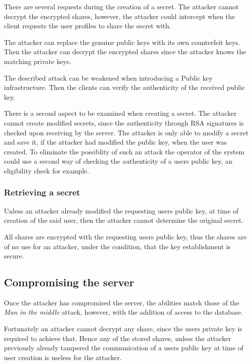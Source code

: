 There are several requests during the creation of a secret. The attacker cannot
decrypt the encrypted shares, however, the attacker could intercept when the
client requests the user profiles to share the secret with.

The attacker can replace the genuine public keys with its own counterfeit keys.
Then the attacker can decrypt the encrypted shares since the attacker knows the
matching private keys.

The described attack can be weakened when introducing a Public key
infrastructure. Then the clients can verify the authenticity of the received
public key.

There is a second aspect to be examined when creating a secret. The attacker
cannot create modified secrets, since the authenticity through RSA signatures
is checked upon receiving by the server. The attacker is only able to modify a
secret and save it, if the attacker had modified the public key, when the user
was created. To eliminate the possiblity of such an attack the operator of the
system could use a second way of checking the authenticity of a users public
key, an eligibility check for example.

\subsubsection{Retrieving a secret}

Unless an attacker already modified the requesting users public key, at time of
creation of the said user, then the attacker cannot determine the original
secret.

All shares are encrypted with the requesting users public key, thus the shares
are of no use for an attacker, under the condition, that the key establishment
is secure.

\subsection{Compromising the server}

Once the attacker has compromised the server, the abilities match those of the
\textit{Man in the middle} attack, however, with the addition of access to the
database.

Fortunately an attacker cannot decrypt any share, since the users private key
is required to achieve that. Hence any of the stored shares, unless the
attacker previously already tampered the communication of a users public key at
time of user creation is useless for the attacker.

